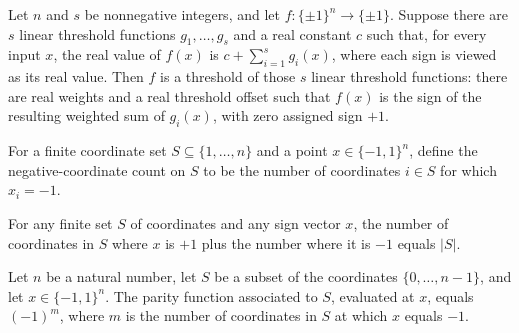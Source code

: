 \begin{theorem}
\label{FABL.isThresholdOfThresholds_of_isRealSumOfLinearThresholds}
\leanok
{}
Let $n$ and $s$ be nonnegative integers, and let $f:\{\pm1\}^n\to\{\pm1\}$. Suppose
there are $s$ linear threshold functions $g_1,\ldots,g_s$ and a real constant $c$ such
that, for every input $x$, the real value of $f(x)$ is $c+\sum_{i=1}^s g_i(x)$, where
each sign is viewed as its real value. Then $f$ is a threshold of those $s$ linear
threshold functions: there are real weights and a real threshold offset such that $f(x)$
is the sign of the resulting weighted sum of $g_i(x)$, with zero assigned sign $+1$.
\end{theorem}

\begin{definition}
\label{FABL.negativeCoordinateCountOn}
\leanok
For a finite coordinate set $S\subseteq\{1,\ldots,n\}$ and a point $x\in\{−1,1\}^n$,
define the negative-coordinate count on $S$ to be the number of coordinates $i\in S$ for
which $x_i=−1$.
\end{definition}

\begin{theorem}
\label{FABL.positiveCoordinateCountOn_add_negativeCoordinateCountOn}
\leanok
{}
For any finite set $S$ of coordinates and any sign vector $x$, the number of coordinates
in $S$ where $x$ is $+1$ plus the number where it is $-1$ equals $|S|$.
\end{theorem}

\begin{theorem}
\label{FABL.parityFunction_eq_neg_one_pow_negativeCoordinateCountOn}
\leanok
{}
Let $n$ be a natural number, let $S$ be a subset of the coordinates
$\{0,\ldots,n-1\}$, and let $x\in\{ -1,1\}^n$. The parity function associated to
$S$, evaluated at $x$, equals $(-1)^m$, where $m$ is the number of coordinates in $S$ at
which $x$ equals $-1$.
\end{theorem}

